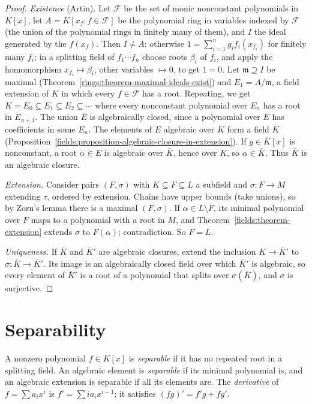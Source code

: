 \begin{proof}
\emph{Existence} (Artin). Let $\mathcal{F}$ be the set of monic nonconstant polynomials in
$K[x]$, let $A = K[x_f : f \in \mathcal{F}]$ be the polynomial ring in variables indexed by
$\mathcal{F}$ (the union of the polynomial rings in finitely many of them), and $I$ the ideal
generated by the $f(x_f)$. Then $I \neq A$: otherwise $1 = \sum_{i=1}^n g_i f_i(x_{f_i})$ for
finitely many $f_i$; in a splitting field of $f_1 \cdots f_n$ choose roots $\beta_i$ of $f_i$,
and apply the homomorphism $x_{f_i} \mapsto \beta_i$, other variables $\mapsto 0$, to get $1 = 0$. Let
$\mathfrak{m} \supseteq I$ be maximal (Theorem~\ref{rings:theorem-maximal-ideals-exist}) and
$E_1 = A/\mathfrak{m}$, a field extension of $K$ in which every $f \in \mathcal{F}$ has a root.
Repeating, we get $K = E_0 \subseteq E_1 \subseteq E_2 \subseteq \cdots$ where every nonconstant polynomial
over $E_n$ has a root in $E_{n+1}$. The union $E$ is algebraically closed, since a
polynomial over $E$ has coefficients in some $E_n$. The elements of $E$ algebraic over
$K$ form a field $\bar K$ (Proposition~\ref{fields:proposition-algebraic-closure-in-extension}).
If $g \in \bar K[x]$ is nonconstant, a root $\alpha \in E$ is algebraic over $\bar K$, hence over
$K$, so $\alpha \in \bar K$. Thus $\bar K$ is an algebraic closure.

\emph{Extension.} Consider pairs $(F, \sigma)$ with $K \subseteq F \subseteq L$ a subfield and
$\sigma \colon F \to M$ extending $\tau$, ordered by extension. Chains have upper bounds (take
unions), so by Zorn's lemma there is a maximal $(F, \sigma)$. If $\alpha \in L \setminus F$, its minimal
polynomial over $F$ maps to a polynomial with a root in $M$, and
Theorem~\ref{fields:theorem-extension} extends $\sigma$ to $F(\alpha)$; contradiction. So $F = L$.

\emph{Uniqueness.} If $\bar K$ and $\bar K'$ are algebraic closures, extend the inclusion
$K \to \bar K'$ to $\sigma \colon \bar K \to \bar K'$. Its image is an algebraically closed field over
which $\bar K'$ is algebraic, so every element of $\bar K'$ is a root of a polynomial that
splits over $\sigma(\bar K)$, and $\sigma$ is surjective.
\end{proof}

\section{Separability}\label{fields:section-separability}

\begin{definition}\label{fields:definition-separable}
A nonzero polynomial $f \in K[x]$ is \emph{separable} if it has no repeated root in a
splitting field. An algebraic element is \emph{separable} if its minimal polynomial is,
and an algebraic extension is separable if all its elements are. The \emph{derivative} of
$f = \sum a_i x^i$ is $f' = \sum i a_i x^{i-1}$; it satisfies $(fg)' = f'g + fg'$.
\end{definition}


